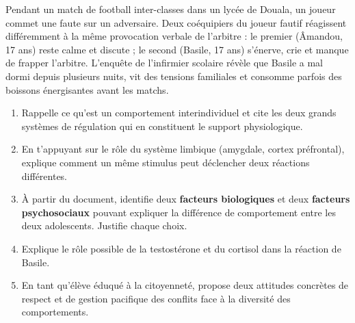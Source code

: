 \documentclass[11pt]{article}
\begin{document}
\begin{exercice}
Pendant un match de football inter-classes dans un lycée de Douala, un joueur commet une faute sur un adversaire. Deux coéquipiers du joueur fautif réagissent différemment à la même provocation verbale de l'arbitre : le premier (Âmandou, 17 ans) reste calme et discute ; le second (Basile, 17 ans) s'énerve, crie et manque de frapper l'arbitre. L'enquête de l'infirmier scolaire révèle que Basile a mal dormi depuis plusieurs nuits, vit des tensions familiales et consomme parfois des boissons énergisantes avant les matchs.
\begin{enumerate}
\item Rappelle ce qu'est un comportement interindividuel et cite les deux grands systèmes de régulation qui en constituent le support physiologique.
\item En t'appuyant sur le rôle du système limbique (amygdale, cortex préfrontal), explique comment un même stimulus peut déclencher deux réactions différentes.
\item À partir du document, identifie deux \textbf{facteurs biologiques} et deux \textbf{facteurs psychosociaux} pouvant expliquer la différence de comportement entre les deux adolescents. Justifie chaque choix.
\item Explique le rôle possible de la testostérone et du cortisol dans la réaction de Basile.
\item En tant qu'élève éduqué à la citoyenneté, propose deux attitudes concrètes de respect et de gestion pacifique des conflits face à la diversité des comportements.
\end{enumerate}
\end{exercice}
\end{document}
